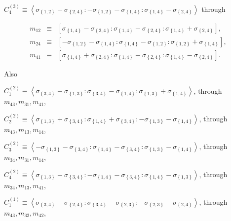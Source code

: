 \documentclass[11pt]{article}
\begin{document}
$C_{4}^{\left( 3\right) }\equiv \left\langle \sigma _{\left\{ 1,2\right\}
}-\sigma _{\left\{ 2,4\right\} }:-\sigma _{\left\{ 1,2\right\} }-\sigma
_{\left\{ 1,4\right\} }:\sigma _{\left\{ 1,4\right\} }-\sigma _{\left\{
2,4\right\} }\right\rangle $ through

\begin{eqnarray*}
m_{12} &\equiv &\left[ \sigma _{\left\{ 1,4\right\} }-\sigma _{\left\{
2,4\right\} }:\sigma _{\left\{ 1,4\right\} }-\sigma _{\left\{ 2,4\right\}
}:\sigma _{\left\{ 1,4\right\} }+\sigma _{\left\{ 2,4\right\} }\right] , \\
m_{24} &\equiv &\left[ -\sigma _{\left\{ 1,2\right\} }-\sigma _{\left\{
1,4\right\} }:\sigma _{\left\{ 1,4\right\} }-\sigma _{\left\{ 1,2\right\}
}:\sigma _{\left\{ 1,2\right\} }+\sigma _{\left\{ 1,4\right\} }\right] , \\
m_{41} &\equiv &\left[ \sigma _{\left\{ 1,4\right\} }+\sigma _{\left\{
2,4\right\} }:\sigma _{\left\{ 1,4\right\} }-\sigma _{\left\{ 2,4\right\}
}:\sigma _{\left\{ 1,4\right\} }-\sigma _{\left\{ 2,4\right\} }\right] .
\end{eqnarray*}

Also

$C_{1}^{\left( 2\right) }\equiv \left\langle \sigma _{\left\{ 3,4\right\}
}-\sigma _{\left\{ 1,3\right\} }:\sigma _{\left\{ 3,4\right\} }-\sigma
_{\left\{ 1,4\right\} }:\sigma _{\left\{ 1,3\right\} }+\sigma _{\left\{
1,4\right\} }\right\rangle $, through $m_{43},m_{31},m_{41}$,

$C_{2}^{\left( 2\right) }\equiv \left\langle \sigma _{\left\{ 1,3\right\}
}+\sigma _{\left\{ 3,4\right\} }:\sigma _{\left\{ 1,4\right\} }+\sigma
_{\left\{ 3,4\right\} }:-\sigma _{\left\{ 1,3\right\} }-\sigma _{\left\{
1,4\right\} }\right\rangle $, through $m_{43},m_{13},m_{14}$,

$C_{3}^{\left( 2\right) }\equiv \left\langle -\sigma _{\left\{ 1,3\right\}
}-\sigma _{\left\{ 3,4\right\} }:\sigma _{\left\{ 1,4\right\} }-\sigma
_{\left\{ 3,4\right\} }:\sigma _{\left\{ 1,3\right\} }-\sigma _{\left\{
1,4\right\} }\right\rangle $, through $m_{34},m_{31},m_{14}$,

$C_{4}^{\left( 2\right) }\equiv \left\langle \sigma _{\left\{ 1,3\right\}
}-\sigma _{\left\{ 3,4\right\} }:-\sigma _{\left\{ 1,4\right\} }-\sigma
_{\left\{ 3,4\right\} }:\sigma _{\left\{ 1,4\right\} }-\sigma _{\left\{
1,3\right\} }\right\rangle $, through $m_{34},m_{13},m_{41}$,

$C_{1}^{\left( 1\right) }\equiv \left\langle \sigma _{\left\{ 3,4\right\}
}-\sigma _{\left\{ 2,4\right\} }:\sigma _{\left\{ 3,4\right\} }-\sigma
_{\left\{ 2,3\right\} }:-\sigma _{\left\{ 2,3\right\} }-\sigma _{\left\{
2,4\right\} }\right\rangle $, through $m_{43},m_{32},m_{42}$,
\end{document}
